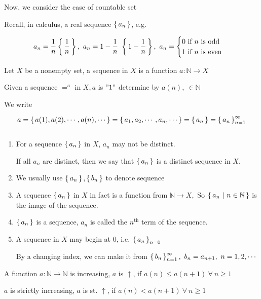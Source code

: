 Now, we consider the case of countable set

\begin{tcolorbox}
	Recall, in calculus, a real sequence $\left\{ \,a_n \,\right\}$, e.g.
	
	$$a_n = \frac{1}{n}\left\{ \,\frac{1}{n} \,\right\},~a_n = 1 - \frac{1}{n}~\left\{ \,1-\frac{1}{n} \,\right\},~a_n=\begin{cases}
		0 \text{ if } n \text{ is odd}\\1 \text{ if } n \text{ is even}
	\end{cases}$$
\end{tcolorbox}

\begin{defn}
	Let $X$ be a nonempty set, a sequence in $X$ is a function $a:\mathbb N \rightarrow X$

	Given a sequence $=^{a}$ in $X, a$ is $"1"$ determine by $a(n),~ \in \mathbb N$
	
	We write
	
	$$a = \left\{ \,a(1),a(2),\cdots,a(n),\cdots \,\right\} = \left\{ \,a_1,a_2,\cdots,a_n,\cdots \,\right\} = \left\{ \,a_n \,\right\} = \left\{ \,a_n \,\right\}^{\infty}_{n = 1}$$ 

\end{defn}

\begin{rmk*} $ $
	\begin{enumerate}
		\item For a sequence $\left\{ \,a_n \,\right\}$ in $X$, $a_n$ may not be distinct.
		
		If all $a_n$ are distinct, then we say that $\left\{ \,a_n \,\right\}$ is a distinct sequence in $X$.
		
		\item We usually use $\left\{ \,a_n \,\right\},\left\{ \,b_n \,\right\}$ to denote sequence
		\item A sequence $\left\{ \,a_n \,\right\}$ in $X$ in fact is a function from $\mathbb N \rightarrow X,$ So $\left\{ \,a_n~|~n \in \mathbb N \,\right\}$ is the image of the sequence.
		\item $\left\{ \,a_n \,\right\}$ is a sequence, $a_n$ is called the $n^{\text{th}}$ term of the sequence.
		\item A sequence in $X$ may begin at $0$, i.e. $\left\{ \,a_n \,\right\}_{n=0}$
		
		By a changing index, we can make it from $\left\{ \,b_n \,\right\}^{\infty}_{n=1},~b_n = a_{n+1},~n = 1,2,\cdots$ 
	
	\end{enumerate}
\end{rmk*}

\begin{defn}[increasing] $ $\\
	A function $a:\mathbb N \rightarrow \mathbb N$ is increasing, $a$ is $\uparrow$, if $a(n) \leq a(n+1) ~\forall~n \geq 1$
	
	$a$ is strictly increasing, $a$ is st. $\uparrow$, if $a(n) < a(n+1) ~\forall~n \geq 1$
\end{defn}

